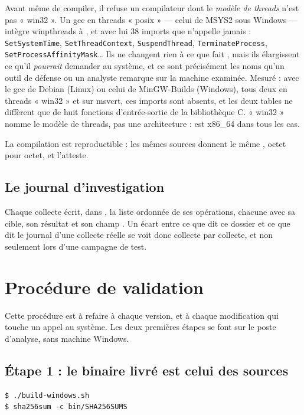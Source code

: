 \documentclass[11pt,a4paper,oneside]{report}
\begin{document}
Avant même de compiler, il refuse un compilateur dont le \emph{modèle de
threads} n'est pas « win32 ». Un gcc en threads « posix » — celui de MSYS2
sous Windows — intègre winpthreads à , et avec lui 38
imports que \wac{} n'appelle jamais : \texttt{SetSystemTime},
\texttt{SetThreadContext}, \texttt{SuspendThread},
\texttt{TerminateProcess},
\texttt{SetProcessAffinityMask}\ldots{} Ils ne changent rien à ce que fait
\wac{}, mais ils élargissent ce qu'il \emph{pourrait} demander au système, et
ce sont précisément les noms qu'un outil de défense ou un analyste remarque
sur la machine examinée. Mesuré : avec le gcc de Debian (Linux) ou celui de
MinGW-Builds (Windows), tous deux en threads « win32 » et sur msvcrt, ces
imports sont absents, et les deux tables ne diffèrent que de huit fonctions
d'entrée-sortie de la bibliothèque C. « win32 » nomme le modèle de threads,
pas une architecture :  est x86\_64 dans tous les cas.

La compilation est reproductible : les mêmes sources donnent le même
, octet pour octet, et  l'atteste.

\section{Le journal d'investigation}

Chaque collecte écrit, dans , la liste ordonnée
de ses opérations, chacune avec sa cible, son résultat et son champ
. Un écart entre ce que dit ce dossier et ce que dit le
journal d'une collecte réelle se voit donc collecte par collecte, et non
seulement lors d'une campagne de test.

\chapter{Procédure de validation}\label{ch:procedure}

Cette procédure est à refaire à chaque version, et à chaque modification qui
touche un appel au système. Les deux premières étapes se font sur le poste
d'analyse, sans machine Windows.

\section{Étape 1 : le binaire livré est celui des sources}

\begin{lstlisting}
$ ./build-windows.sh
$ sha256sum -c bin/SHA256SUMS
\end{lstlisting}
\end{document}
